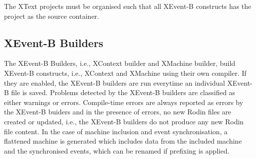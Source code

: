 The XText projects must be organised such that all XEvent-B constructs has the project as the source container.

\subsection{XEvent-B Builders}
\label{sec:xevent-b-builders}
The XEvent-B Builders, i.e., XContext builder and XMachine builder, build XEvent-B constructs, i.e., XContext and XMachine using their own compiler.  If they are enabled, the XEvent-B builders are run everytime an individual XEvent-B file is saved.  Problems detected by the XEvent-B builders are classified as either warnings or errors.  Compile-time errors are always reported as errors by the XEvent-B buiders and in the presence of errors, no new Rodin files are created or updated, i.e., the XEvent-B builders do not produce any new Rodin file content. In the case of machine inclusion and event synchronisation, a flattened machine is generated which includes data from the included machine and the synchronised events, which can be renamed if prefixing is applied.


